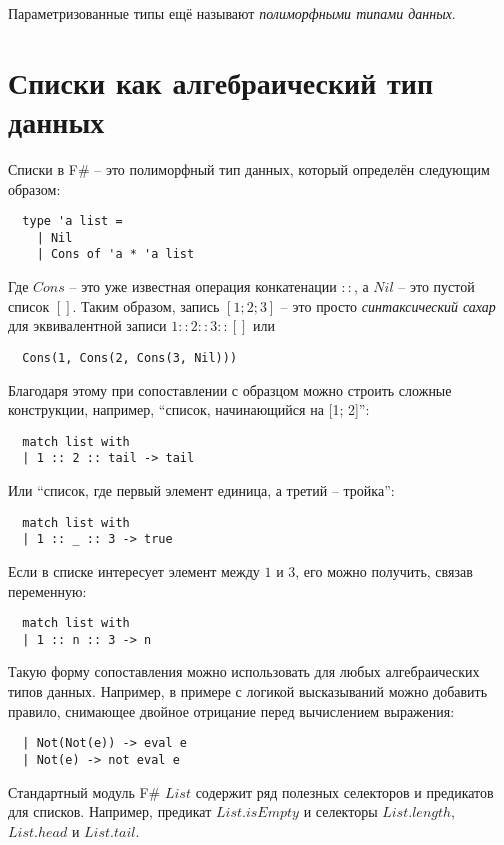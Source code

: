 \documentclass[a4paper,11pt]{article}
\begin{document}
Параметризованные типы ещё называют \emph{полиморфными типами данных}.
\section{Списки как алгебраический тип данных}
Списки в F\# -- это полиморфный тип данных, который определён следующим образом:
\begin{lstlisting}
  type 'a list = 
    | Nil
    | Cons of 'a * 'a list
\end{lstlisting}

Где $Cons$ -- это уже известная операция конкатенации $::$, а $Nil$ -- это 
пустой список $[]$. Таким образом, запись $[1; 2; 3]$ -- это просто 
\emph{синтаксический сахар} для эквивалентной записи $1 :: 2 :: 3 :: []$ или
\begin{lstlisting}
  Cons(1, Cons(2, Cons(3, Nil))) 
\end{lstlisting}

Благодаря этому при сопоставлении с образцом можно строить сложные конструкции,
например, ``список, начинающийся на [1; 2]'':
\begin{lstlisting}
  match list with
  | 1 :: 2 :: tail -> tail
\end{lstlisting}
Или ``список, где первый элемент единица, а третий -- тройка'':
\begin{lstlisting}
  match list with
  | 1 :: _ :: 3 -> true
\end{lstlisting}
Если в списке интересует элемент между $1$ и $3$, его можно получить, связав
переменную:
\begin{lstlisting}
  match list with
  | 1 :: n :: 3 -> n
\end{lstlisting}

Такую форму сопоставления можно использовать для любых алгебраических типов
данных. Например, в примере с логикой высказываний можно добавить правило, 
снимающее двойное отрицание перед вычислением выражения:
\begin{lstlisting}
  | Not(Not(e)) -> eval e
  | Not(e) -> not eval e
\end{lstlisting}

Стандартный модуль F\# $List$ содержит ряд полезных селекторов и предикатов
для списков. Например, предикат $List.isEmpty$ и селекторы $List.length$,
$List.head$ и $List.tail$.
\end{document}
